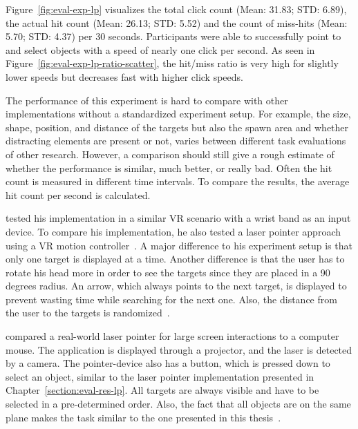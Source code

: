 Figure~\ref{fig:eval-exp-lp} visualizes the total click count (Mean: 31.83; \ac{STD}: 6.89), the actual hit count (Mean: 26.13; \ac{STD}: 5.52) and the count of miss-hits (Mean: 5.70; \ac{STD}: 4.37) per 30 seconds. Participants were able to successfully point to and select objects with a speed of nearly one click per second. As seen in Figure~\ref{fig:eval-exp-lp-ratio-scatter}, the hit/miss ratio is very high for slightly lower speeds but decreases fast with higher click speeds.

The performance of this experiment is hard to compare with other implementations without a standardized experiment setup. For example, the size, shape, position, and distance of the targets but also the spawn area and whether distracting elements are present or not, varies between different task evaluations of other research. However, a comparison should still give a rough estimate of whether the performance is similar, much better, or really bad. Often the hit count is measured in different time intervals. To compare the results, the average hit count per second is calculated.

\citeauthor{Kamm.2018} tested his implementation in a similar \ac{VR} scenario with a wrist band as an input device. To compare his implementation, he also tested a laser pointer approach using a \ac{VR} motion controller~\cite[39]{Kamm.2018}. A major difference to his experiment setup is that only one target is displayed at a time. Another difference is that the user has to rotate his head more in order to see the targets since they are placed in a 90 degrees radius. An arrow, which always points to the next target, is displayed to prevent wasting time while searching for the next one. Also, the distance from the user to the targets is randomized~\cite[45]{Kamm.2018}.

\citeauthor{JiYoungOh.2002} compared a real-world laser pointer for large screen interactions to a computer mouse. The application is displayed through a projector, and the laser is detected by a camera. The pointer-device also has a button, which is pressed down to select an object, similar to the laser pointer implementation presented in Chapter~\ref{section:eval-res-lp}. All targets are always visible and have to be selected in a pre-determined order. Also, the fact that all objects are on the same plane makes the task similar to the one presented in this thesis~\cite[3\psq]{JiYoungOh.2002}.

